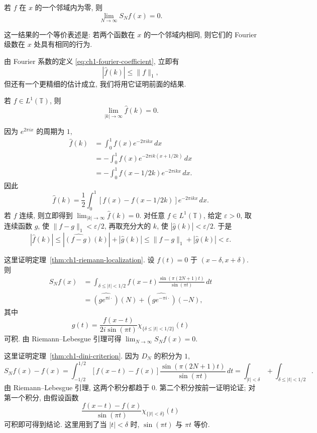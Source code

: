 \hypertarget{chapter-01-page-016}{}
\begin{Theorem}
\label{thm:ch1-riemann-localization}
若 $f$ 在 $x$ 的一个邻域内为零, 则
\[
 \lim_{N\to\infty}S_Nf(x)=0.
\]
\end{Theorem}

这一结果的一个等价表述是: 若两个函数在 $x$ 的一个邻域内相同, 则它们的 Fourier 级数在 $x$ 处具有相同的行为.

由 Fourier 系数的定义 \eqref{eq:ch1-fourier-coefficient}, 立即有
\[
 |\widehat f(k)|\le\|f\|_1,
\]
但还有一个更精细的估计成立, 我们将用它证明前面的结果.

\begin{Lemma}
\label{lem:ch1-riemann-lebesgue}
若 $f\in L^1(\mathbb T)$, 则
\[
 \lim_{|k|\to\infty}\widehat f(k)=0.
\]
\end{Lemma}

\begin{Proof}
因为 $e^{2\pi ix}$ 的周期为 $1$,
\[
\begin{aligned}
 \widehat f(k)
 &=\int_0^1f(x)e^{-2\pi ikx}\,dx\\
 &=-\int_0^1f(x)e^{-2\pi ik(x+1/2k)}\,dx\\
 &=-\int_0^1f(x-1/2k)e^{-2\pi ikx}\,dx.
\end{aligned}
\]
因此
\[
 \widehat f(k)=\frac12\int_0^1[f(x)-f(x-1/2k)]e^{-2\pi ikx}\,dx.
\]
若 $f$ 连续, 则立即得到 $\lim_{|k|\to\infty}\widehat f(k)=0$. 对任意 $f\in L^1(\mathbb T)$, 给定 $\varepsilon>0$, 取连续函数 $g$, 使 $\|f-g\|_1<\varepsilon/2$, 再取充分大的 $k$, 使 $|\widehat g(k)|<\varepsilon/2$. 于是
\[
 |\widehat f(k)|\le|\widehat{(f-g)}(k)|+|\widehat g(k)|
 \le\|f-g\|_1+|\widehat g(k)|<\varepsilon.
\]
\end{Proof}

\hypertarget{chapter-01-page-017}{}
\begin{Proof}
这里证明定理~\ref{thm:ch1-riemann-localization}. 设 $f(t)=0$ 于 $(x-\delta,x+\delta)$. 则
\[
\begin{aligned}
 S_Nf(x)
 &=\int_{\delta\le|t|<1/2}f(x-t)
 \frac{\sin(\pi(2N+1)t)}{\sin(\pi t)}\,dt\\
 &=\widehat{(ge^{\pi i\cdot})}(N)+\widehat{(ge^{-\pi i\cdot})}(-N),
\end{aligned}
\]
其中
\[
 g(t)=\frac{f(x-t)}{2i\sin(\pi t)}\chi_{\{\delta\le|t|<1/2\}}(t)
\]
可积. 由 Riemann--Lebesgue 引理可得 $\lim_{N\to\infty}S_Nf(x)=0$.
\end{Proof}

\begin{Proof}
这里证明定理~\ref{thm:ch1-dini-criterion}. 因为 $D_N$ 的积分为 $1$,
\[
 S_Nf(x)-f(x)=\int_{-1/2}^{1/2}[f(x-t)-f(x)]
 \frac{\sin(\pi(2N+1)t)}{\sin(\pi t)}\,dt
 =\int_{|t|<\delta}+\int_{\delta\le|t|<1/2}.
\]
由 Riemann--Lebesgue 引理, 这两个积分都趋于 $0$. 第二个积分按前一证明论证; 对第一个积分, 由假设函数
\[
 \frac{f(x-t)-f(x)}{\sin(\pi t)}\chi_{\{|t|<\delta\}}(t)
\]
可积即可得到结论. 这里用到了当 $|t|<\delta$ 时, $\sin(\pi t)$ 与 $\pi t$ 等价.
\end{Proof}

